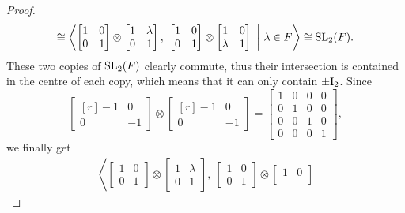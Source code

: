 \begin{proof}
\begin{multline*}
		\cong 
		\left\langle
			\begin{bmatrix}
				1 & 0 \\
				0 & 1
			\end{bmatrix} \otimes
			\begin{bmatrix}
				1 & \lambda \\
				0 & 1
			\end{bmatrix},\ 
			\begin{bmatrix}
				1 & 0 \\
				0 & 1
			\end{bmatrix} \otimes
			\begin{bmatrix}
				1 & 0 \\
				\lambda & 1
			\end{bmatrix}\ 
			\bigg|
			\ 
			\lambda \in F
		\right\rangle \cong \SL_2(F).
	\end{multline*}
	These two copies of $\mathrm{SL}_2(F)$ clearly commute, thus
	their intersection is contained in the centre of each copy, 
	which means that it can only contain $\pm \mathord{\mathrm{I}}_2$.
	Since
	\begin{equation*}
		\begin{bmatrix}[r]
				-1 & 0 \\
				0 & -1
		\end{bmatrix} \otimes
		\begin{bmatrix}[r]
				-1 & 0 \\
				0 & -1
		\end{bmatrix} = 
		\begin{bmatrix}
			1 & 0 & 0 & 0 \\
			0 & 1 & 0 & 0 \\
			0 & 0 & 1 & 0 \\
			0 & 0 & 0 & 1
		\end{bmatrix},
	\end{equation*}
	we finally get
	\begin{multline*}
		\left\langle
			\begin{bmatrix}
				1 & 0 \\
				0 & 1
			\end{bmatrix} \otimes 
			\begin{bmatrix}
				1 & \lambda \\
				0 & 1
			\end{bmatrix},\ 
			\begin{bmatrix}
				1 & 0 \\
				0 & 1
			\end{bmatrix} \otimes
			\begin{bmatrix}
				1 & 0 \\

\end{bmatrix}
\end{multline*}
\end{proof}
